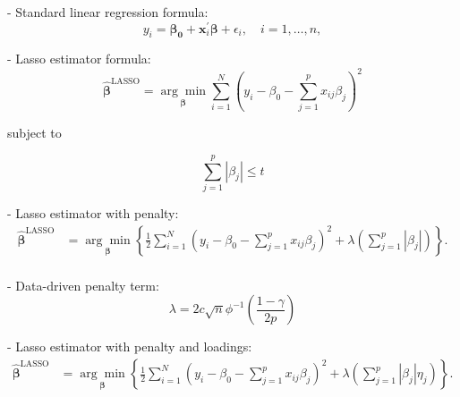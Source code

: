 - Standard linear regression formula: 
\begin{equation}

    y_i=\boldsymbol{\beta_0} +\mathbf{x}_i^\prime \boldsymbol{\beta}+\epsilon_i, \quad i = 1, \ldots, n,
    \tag{1}
    \end{equation}

- Lasso estimator formula:
\begin{equation}
    \hat{\boldsymbol{\beta}}^{\text{LASSO}}=\underset{\boldsymbol{\beta}}{\arg \min}\sum_{i=1}^N (y_i-\beta_0-\sum_{j=1}^p x_{i j}\beta_j)^2
    \tag{2}
    \end{equation} 
    
    subject to 
    
    \begin{equation}
    \sum_{j=1}^{p}\left|\beta_{j}\right|\leq t
    \tag{3}
    \end{equation}
    
- Lasso estimator with penalty: 
\begin{equation}
    \begin{aligned}
    \hat{\boldsymbol{\beta}}^{\text{LASSO}} &=\underset{\boldsymbol{\beta}}{\arg \min}\left\{\frac{1}{2}\sum_{i=1}^N (y_i-\beta_0-\sum_{j=1}^p x_{i j}\beta_j)^2 +\lambda \left(\sum_{j=1}^p |\beta_j|\right)\right\}.\\
    \end{aligned}
    \tag{4}
    \end{equation}

- Data-driven penalty term: 
\begin{equation}
    \lambda=2c \sqrt{n} \phi^{-1} (\frac{1-\gamma}{2p})
    \tag{6}
    \end{equation}

- Lasso estimator with penalty and loadings: 
\begin{equation}
    \begin{aligned}
    \hat{\boldsymbol{\beta}}^{\text{LASSO}} &=\underset{\boldsymbol{\beta}}{\arg \min}\left\{\frac{1}{2}\sum_{i=1}^N (y_i-\beta_0-\sum_{j=1}^p x_{i j}\beta_j)^2 +\lambda \left(\sum_{j=1}^p |\beta_j|\eta_j\right)\right\}.\\
    \end{aligned}
    \tag{5}
    \end{equation}

